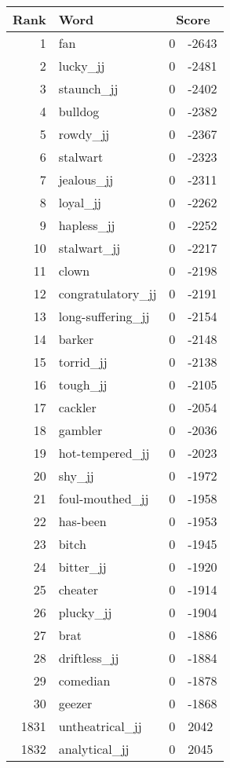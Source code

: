 \begin{longtable}[!htbp]{| rlr@{.}l |}
    \hline
    \textbf{Rank} & \textbf{Word} & \multicolumn{2}{c|}{\textbf{Score}} \\
    \hline
    \endhead
    1 & fan & 0 & -2643 \\
    2 & lucky\_jj & 0 & -2481 \\
    3 & staunch\_jj & 0 & -2402 \\
    4 & bulldog & 0 & -2382 \\
    5 & rowdy\_jj & 0 & -2367 \\
    6 & stalwart & 0 & -2323 \\
    7 & jealous\_jj & 0 & -2311 \\
    8 & loyal\_jj & 0 & -2262 \\
    9 & hapless\_jj & 0 & -2252 \\
    10 & stalwart\_jj & 0 & -2217 \\
    11 & clown & 0 & -2198 \\
    12 & congratulatory\_jj & 0 & -2191 \\
    13 & long-suffering\_jj & 0 & -2154 \\
    14 & barker & 0 & -2148 \\
    15 & torrid\_jj & 0 & -2138 \\
    16 & tough\_jj & 0 & -2105 \\
    17 & cackler & 0 & -2054 \\
    18 & gambler & 0 & -2036 \\
    19 & hot-tempered\_jj & 0 & -2023 \\
    20 & shy\_jj & 0 & -1972 \\
    21 & foul-mouthed\_jj & 0 & -1958 \\
    22 & has-been & 0 & -1953 \\
    23 & bitch & 0 & -1945 \\
    24 & bitter\_jj & 0 & -1920 \\
    25 & cheater & 0 & -1914 \\
    26 & plucky\_jj & 0 & -1904 \\
    27 & brat & 0 & -1886 \\
    28 & driftless\_jj & 0 & -1884 \\
    29 & comedian & 0 & -1878 \\
    30 & geezer & 0 & -1868 \\
    1831 & untheatrical\_jj & 0 & 2042 \\
    1832 & analytical\_jj & 0 & 2045 \\

\end{longtable}
